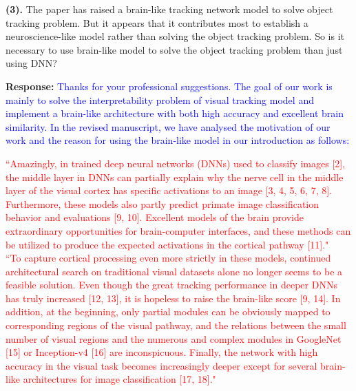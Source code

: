\documentclass[12pt,journal,onecolumn]{IEEEtran}
\begin{document}



\vspace{8pt}

\textbf{(3).} The paper has raised a brain-like tracking network model to solve object tracking problem. 
But it appears that it contributes most to establish a neuroscience-like model rather than solving the object tracking problem. 
So is it necessary to use brain-like model to solve the object tracking problem than just using DNN?

\textbf{Response:} \textcolor{blue}{Thanks for your professional suggestions. 
The goal of our work is mainly to solve the interpretability problem of visual tracking model and implement a brain-like architecture with both high accuracy and excellent brain similarity. 
In the revised manuscript, we have analysed the motivation of our work and the reason for using the brain-like model in our introduction as follows:
}

\textcolor{red}{
``Amazingly, in
trained deep neural networks (DNNs) used to classify images [2], the middle layer in DNNs can partially explain why the nerve cell in the middle layer of the visual cortex has specific activations to an image [3, 4, 5, 6, 7, 8]. 
Furthermore, these models also partly predict primate image classification behavior and evaluations [9, 10].
Excellent models of the brain provide extraordinary opportunities for brain-computer interfaces, and these methods can be utilized to produce the expected activations in the cortical pathway [11]." 
} \\
\textcolor{red}{
``To capture cortical processing even more strictly
in these models, continued architectural search on
traditional visual datasets alone no longer seems
to be a feasible solution. 
Even though the great tracking performance in deeper DNNs has truly increased [12, 13], it is hopeless to raise the brain-like score [9, 14]. 
In addition, at the beginning, only partial modules can be obviously mapped to corresponding regions of the visual pathway, and the relations between the small number of visual regions and the numerous and complex modules in GoogleNet [15] or Inception-v4 [16] are inconspicuous. 
Finally, the network with high accuracy in the visual task becomes increasingly deeper except for several brain-like architectures for image classification [17, 18]." 
} \\
\end{document}
